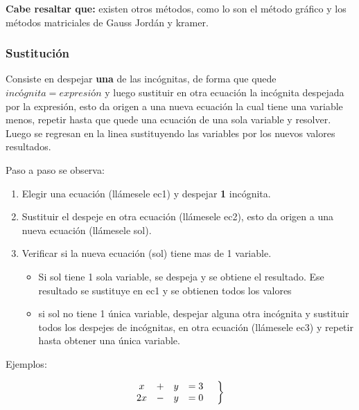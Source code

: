     \textbf{Cabe resaltar que:} existen otros métodos, como lo son el método
    gráfico y los métodos matriciales de Gauss Jordán y kramer.

    \subsubsection*{Sustitución} \label{Sustitucion}

    Consiste en despejar \textbf{una} de las incógnitas, de forma que quede
    $incógnita=expresión$ y luego sustituir en otra ecuación la incógnita
    despejada por la expresión, esto da origen a una
    nueva ecuación la cual tiene una variable menos, repetir hasta que quede
    una ecuación de una sola variable y resolver. Luego se regresan en la linea
    sustituyendo las variables por los nuevos valores resultados.

    Paso a paso se observa:

    \begin{enumerate}
        \item Elegir una ecuación (llámesele ec1) y despejar \textbf{1} incógnita.
        \item Sustituir el despeje en otra ecuación (llámesele ec2), esto
            da origen a una nueva ecuación (llámesele sol).
        \item Verificar si la nueva ecuación (sol) tiene mas de 1 variable.
            \begin{itemize}
                \item Si sol tiene 1 sola variable, se despeja y se obtiene el
                    resultado. Ese resultado se sustituye en ec1 y se obtienen
                    todos los valores
                \item si sol no tiene 1 única variable, despejar alguna otra incógnita
                    y sustituir todos los despejes de incógnitas,
                    en otra ecuación (llámesele ec3) y repetir hasta
                    obtener una única variable.
            \end{itemize}
    \end{enumerate}

Ejemplos:


    \begin{equation*}
        \left.
        \begin{matrix}
            x &+& y &=3\\
            2x &-& y &=0
        \end{matrix}
        \hspace*{0.5cm}\right\rbrace
    \end{equation*}

